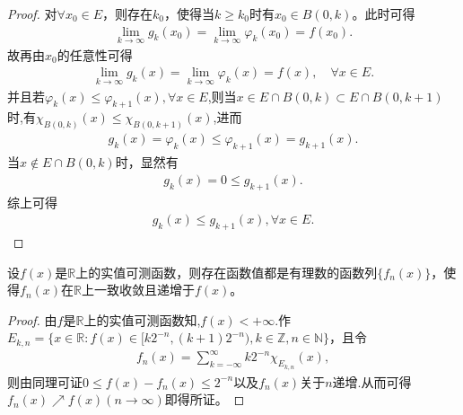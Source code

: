 \documentclass[../../main.tex]{subfiles}%
\begin{document}
\begin{proof}
对$\forall x_0 \in E$，则存在$k_0$，使得当$k \geqslant k_0$时有$x_0 \in B(0,k)$。此时可得
\begin{align*}
\lim_{k \to \infty} g_k(x_0) = \lim_{k \to \infty} \varphi_k(x_0) = f(x_0).
\end{align*}
故再由$x_0$的任意性可得
\begin{align*}
\lim_{k \to \infty} g_k(x) = \lim_{k \to \infty} \varphi_k(x) = f(x),\quad \forall x\in E.
\end{align*} 
并且若$\varphi_k(x)\leqslant \varphi_{k+1}(x),\forall x\in E$,则当$x\in E\cap B(0,k) \subset E\cap B(0,k + 1)$时,有$\chi _{B\left( 0,k \right)}\left( x \right) \leqslant \chi _{B\left( 0,k+1 \right)}\left( x \right)$,进而
\begin{align*}
g_k(x) = \varphi_k(x) \leqslant \varphi_{k + 1}(x) = g_{k + 1}(x).
\end{align*}
当$x\notin E\cap B(0,k)$时，显然有
\begin{align*}
g_k(x) = 0 \leqslant g_{k + 1}(x).
\end{align*}
综上可得
\begin{align*}
g_k(x) \leqslant g_{k + 1}(x), \forall x\in E.
\end{align*} 
\end{proof}

\begin{theorem}
设$f(x)$是$\mathbb{R}$上的实值可测函数，则存在函数值都是有理数的函数列$\{f_n(x)\}$，使得$f_n(x)$在$\mathbb{R}$上一致收敛且递增于$f(x)$。
\end{theorem}
\begin{proof}
由$f$是$\mathbb{R}$上的实值可测函数知,$f(x)<+\infty$.作$E_{k,n} = \{x \in \mathbb{R}: f(x) \in [k2^{-n}, (k + 1)2^{-n}), k \in \mathbb{Z}, n \in \mathbb{N}\}$，且令
\begin{align*}
f_n(x) = \sum_{k = -\infty}^{\infty} k2^{-n} \chi_{E_{k,n}}(x),
\end{align*}
则由同理可证$0 \leqslant f(x) - f_n(x) \leqslant 2^{-n}$以及$f_n(x)$关于$n$递增.从而可得$f_n(x) \nearrow f(x) (n \to \infty)$即得所证。 
\end{proof}
\end{document}
